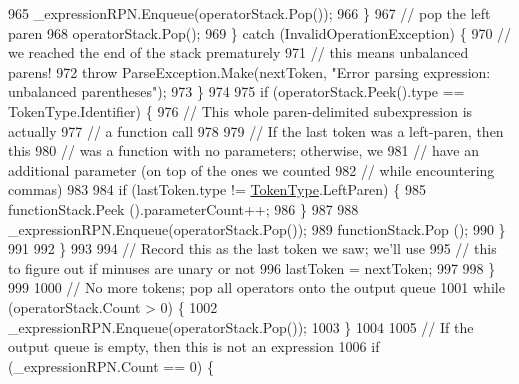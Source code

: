 \begin{DoxyCode}
965                                 \_expressionRPN.Enqueue(operatorStack.Pop());
966                             \}
967                             \textcolor{comment}{// pop the left paren}
968                             operatorStack.Pop();
969                         \} \textcolor{keywordflow}{catch} (InvalidOperationException) \{
970                             \textcolor{comment}{// we reached the end of the stack prematurely}
971                             \textcolor{comment}{// this means unbalanced parens!}
972                             \textcolor{keywordflow}{throw} ParseException.Make(nextToken, \textcolor{stringliteral}{"Error parsing expression: unbalanced
       parentheses"});
973                         \}
974 
975                         \textcolor{keywordflow}{if} (operatorStack.Peek().type == TokenType.Identifier) \{
976                             \textcolor{comment}{// This whole paren-delimited subexpression is actually}
977                             \textcolor{comment}{// a function call}
978 
979                             \textcolor{comment}{// If the last token was a left-paren, then this}
980                             \textcolor{comment}{// was a function with no parameters; otherwise, we }
981                             \textcolor{comment}{// have an additional parameter (on top of the ones we counted}
982                             \textcolor{comment}{// while encountering commas)}
983 
984                             \textcolor{keywordflow}{if} (lastToken.type != \hyperlink{a00029_a301aa7c866593a5b625a8fc158bbeace}{TokenType}.LeftParen) \{
985                                 functionStack.Peek ().parameterCount++;
986                             \}
987 
988                             \_expressionRPN.Enqueue(operatorStack.Pop());
989                             functionStack.Pop ();
990                         \}
991 
992                     \}
993 
994                     \textcolor{comment}{// Record this as the last token we saw; we'll use}
995                     \textcolor{comment}{// this to figure out if minuses are unary or not}
996                     lastToken = nextToken;
997 
998                 \}
999 
1000                 \textcolor{comment}{// No more tokens; pop all operators onto the output queue}
1001                 \textcolor{keywordflow}{while} (operatorStack.Count > 0) \{
1002                     \_expressionRPN.Enqueue(operatorStack.Pop());
1003                 \}
1004 
1005                 \textcolor{comment}{// If the output queue is empty, then this is not an expression}
1006                 \textcolor{keywordflow}{if} (\_expressionRPN.Count == 0) \{

\end{DoxyCode}
